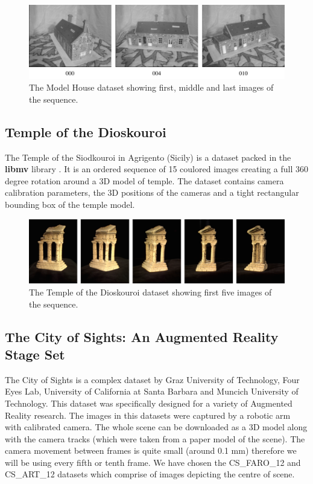 \begin{figure}[ht]
	\begin{center}
		\includegraphics[keepaspectratio,width=\textwidth]{fig/experiments-model-house.pdf}
	\end{center}
	\caption{The Model House dataset showing first, middle and last images of the sequence.}
	\label{fig:modelhouse}
\end{figure}

\subsection*{Temple of the Dioskouroi}
The Temple of the Siodkouroi in Agrigento (Sicily) is a dataset packed in the \textbf{libmv} library \cite{www:libmv}. It is an ordered sequence of 15 coulored images creating a full 360 degree rotation around a 3D model of temple. The dataset contains camera calibration parameters, the 3D positions of the cameras and a tight rectangular bounding box of the temple model. 

\begin{figure}[ht]
	\begin{center}
		\includegraphics[keepaspectratio,width=\textwidth]{fig/experiments-temple.pdf}
	\end{center}
	\caption{The Temple of the Dioskouroi dataset showing first five images of the sequence.}
	\label{fig:temple}
\end{figure}

\subsection*{The City of Sights: An Augmented Reality Stage Set}
The City of Sights \cite{cityofsights_ISMAR2010} is a complex dataset by Graz University of Technology, Four Eyes Lab, University of California at Santa Barbara and Muncich University of Technology. This dataset was specifically designed for a variety of Augmented Reality research. The images in this datasets were captured by a robotic arm with calibrated camera. The whole scene can be downloaded as a 3D model along with the camera tracks (which were taken from a paper model of the scene). The camera movement between frames is quite small (around 0.1 mm) therefore we will be using every fifth or tenth frame. We have chosen the CS\_FARO\_12 and CS\_ART\_12 datasets which comprise of images depicting the centre of scene.

